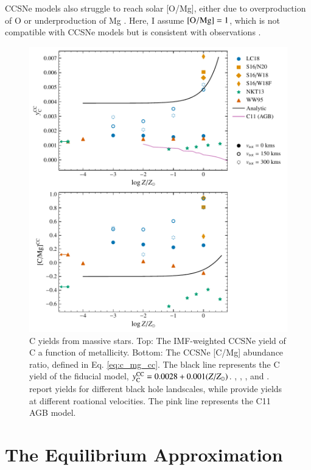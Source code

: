 \documentclass[12pt,oneside]{report}
\newcommand{\Ycc}{\ensuremath{y_{\rm C}^{\rm CC}}}
\begin{document}
CCSNe models also struggle to reach solar [O/Mg], either due to overproduction of O or underproduction of Mg \citep{emily+21}. Here, I assume ${\rm [O/Mg]} = 1$, which is not compatible with CCSNe models but is consistent with observations \cite{Weinberg+19, Weinberg+22}.
    

\begin{figure}[htp]
    \centering
    \includegraphics{y_c_cc.pdf}
    \caption[CCSNe C yields]{
        C yields from massive stars.
        Top: The IMF-weighted CCSNe yield of C a function of metallicity.
        Bottom: The CCSNe [C/Mg] abundance ratio, defined in Eq. \ref{eq:c_mg_cc}. The black line represents the C yield of the fiducial model,
    $\Ycc = 0.0028 + 0.001 (Z/Z_{\odot})$. 
    \citet[red triangles]{WW95}, \citet[orange squares and diamonds]{sukhbold+16}, 
    \citet[green stars]{NKT13}, and \citet[blue circles]{LC18}. \citet{sukhbold+16} report yields for different black hole landscales, while \citet{LC18} provide yields at different roational velocities.
The pink line represents the C11 AGB model.
}
    \label{fig:y_cc}
\end{figure}

\chapter{The Equilibrium Approximation}\label{sec:equilibrium}
\end{document}
